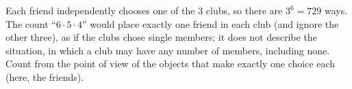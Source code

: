 Each friend independently chooses one of the $3$ clubs, so there are $3^6=\boxed{729}$ ways. The count ``$6\cdot5\cdot4$'' would place exactly one friend in each club (and ignore the other three), as if the clubs chose single members; it does not describe the situation, in which a club may have any number of members, including none. Count from the point of view of the objects that make exactly one choice each (here, the friends).
